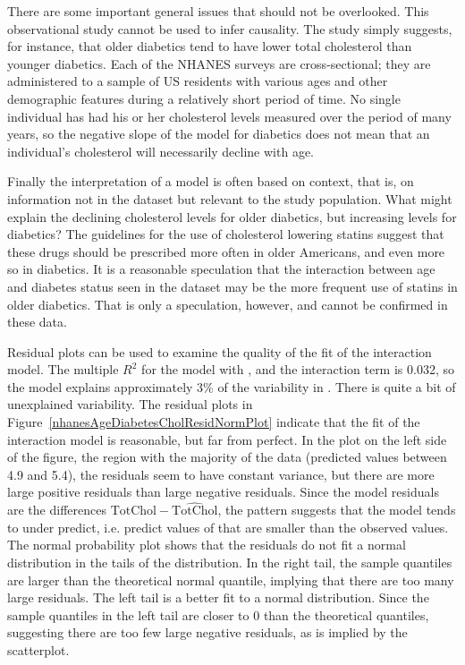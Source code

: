 There are some important general issues that should not be overlooked.  This observational study cannot be used to infer causality.  The study simply suggests, for instance, that older diabetics tend to have lower total cholesterol than younger diabetics.  Each of the NHANES surveys are cross-sectional; they are administered to a sample of US residents with various ages and other demographic features during a relatively short period of time.  No single individual has had his or her cholesterol levels measured over the period of many years, so the negative slope of the model for diabetics does not mean that an individual's cholesterol will necessarily decline with age.

Finally the interpretation of a model is often based on context, that is, on information not in the dataset but relevant to the study population.  What might explain the declining cholesterol levels for older diabetics, but increasing levels for diabetics?  The guidelines for the use of cholesterol lowering statins suggest that these drugs  should be prescribed more often in older Americans, and even more so in diabetics. It is a reasonable speculation that the interaction between age and diabetes status seen in the dataset  may be the more frequent use of statins in older diabetics.  That is only a speculation, however, and cannot be confirmed in these data.

Residual plots can be used to examine the quality of the fit of the interaction model.  The multiple $R^2$ for the model with ,  and the interaction term is 0.032, so the model explains approximately 3\% of the variability in . There is quite a bit of unexplained variability.  The residual plots in Figure~\ref{nhanesAgeDiabetesCholResidNormPlot} indicate that the fit of the interaction model is reasonable, but far from perfect. In the plot on the left side of the figure, the region with the majority of the data (predicted values between 4.9 and 5.4), the residuals seem to have constant variance, but there are more large positive residuals than large negative residuals.  Since the model residuals are the differences $\text{TotChol} - \widehat{\text{TotChol}}$, the pattern suggests that the model tends to under predict, i.e. predict values of  that are smaller than the observed values.  The normal probability plot shows that the residuals do not fit a normal distribution in the tails of the distribution.  In the right tail, the sample quantiles are larger than the theoretical normal quantile, implying that there are too many large residuals.  The left tail is a better fit to a normal distribution.  Since the sample quantiles in the left tail are closer to 0 than the theoretical quantiles, suggesting there are too few large negative residuals, as is implied by the scatterplot.

